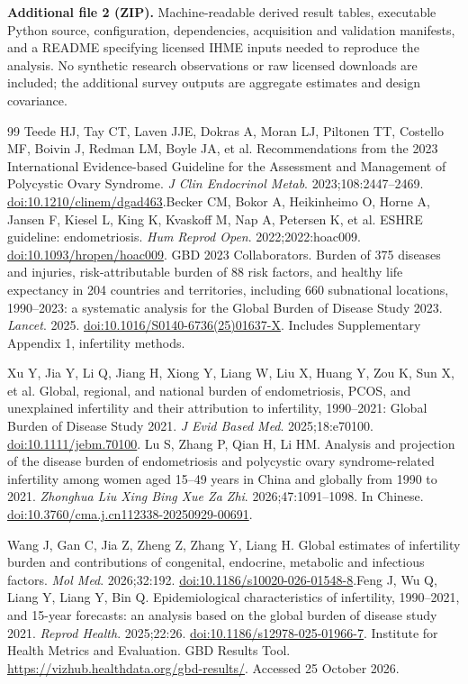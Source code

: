 \documentclass[11pt,a4paper]{article}
\begin{document}
\textbf{Additional file 2 (ZIP).} Machine-readable derived result tables, executable Python source, configuration, dependencies, acquisition and validation manifests, and a README specifying licensed IHME inputs needed to reproduce the analysis. No synthetic research observations or raw licensed downloads are included; the additional survey outputs are aggregate estimates and design covariance.
{\small\doublespacing
\begin{thebibliography}{99}
Teede HJ, Tay CT, Laven JJE, Dokras A, Moran LJ, Piltonen TT, Costello MF, Boivin J, Redman LM, Boyle JA, et al. Recommendations from the 2023 International Evidence-based Guideline for the Assessment and Management of Polycystic Ovary Syndrome. \emph{J Clin Endocrinol Metab}. 2023;108:2447--2469. \href{https://doi.org/10.1210/clinem/dgad463}{doi:10.1210/clinem/dgad463}.Becker CM, Bokor A, Heikinheimo O, Horne A, Jansen F, Kiesel L, King K, Kvaskoff M, Nap A, Petersen K, et al. ESHRE guideline: endometriosis. \emph{Hum Reprod Open}. 2022;2022:hoac009. \href{https://doi.org/10.1093/hropen/hoac009}{doi:10.1093/hropen/hoac009}. GBD 2023 Collaborators. Burden of 375 diseases and injuries, risk-attributable burden of 88 risk factors, and healthy life expectancy in 204 countries and territories, including 660 subnational locations, 1990--2023: a systematic analysis for the Global Burden of Disease Study 2023. \emph{Lancet}. 2025. \href{https://doi.org/10.1016/S0140-6736(25)01637-X}{doi:10.1016/S0140-6736(25)01637-X}. Includes Supplementary Appendix 1, infertility methods.

Xu Y, Jia Y, Li Q, Jiang H, Xiong Y, Liang W, Liu X, Huang Y, Zou K, Sun X, et al. Global, regional, and national burden of endometriosis, PCOS, and unexplained infertility and their attribution to infertility, 1990--2021: Global Burden of Disease Study 2021. \emph{J Evid Based Med}. 2025;18:e70100. \href{https://doi.org/10.1111/jebm.70100}{doi:10.1111/jebm.70100}. Lu S, Zhang P, Qian H, Li HM. Analysis and projection of the disease burden of endometriosis and polycystic ovary syndrome-related infertility among women aged 15--49 years in China and globally from 1990 to 2021. \emph{Zhonghua Liu Xing Bing Xue Za Zhi}. 2026;47:1091--1098. In Chinese. \href{https://doi.org/10.3760/cma.j.cn112338-20250929-00691}{doi:10.3760/cma.j.cn112338-20250929-00691}.

Wang J, Gan C, Jia Z, Zheng Z, Zhang Y, Liang H. Global estimates of infertility burden and contributions of congenital, endocrine, metabolic and infectious factors. \emph{Mol Med}. 2026;32:192. \href{https://doi.org/10.1186/s10020-026-01548-8}{doi:10.1186/s10020-026-01548-8}.Feng J, Wu Q, Liang Y, Liang Y, Bin Q. Epidemiological characteristics of infertility, 1990--2021, and 15-year forecasts: an analysis based on the global burden of disease study 2021. \emph{Reprod Health}. 2025;22:26. \href{https://doi.org/10.1186/s12978-025-01966-7}{doi:10.1186/s12978-025-01966-7}. Institute for Health Metrics and Evaluation. GBD Results Tool. \url{https://vizhub.healthdata.org/gbd-results/}. Accessed 25 October 2026.


\end{thebibliography}}
\end{document}
